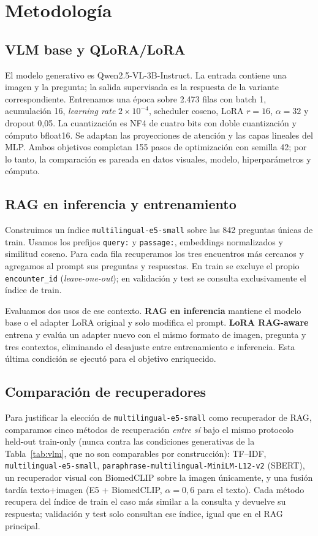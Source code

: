 \documentclass[11pt]{article}
\begin{document}
\section{Metodología}

\subsection{VLM base y QLoRA/LoRA}

El modelo generativo es Qwen2.5-VL-3B-Instruct. La entrada contiene una imagen y la pregunta; la salida supervisada es la respuesta de la variante correspondiente. Entrenamos una época sobre 2.473 filas con batch 1, acumulación 16, \emph{learning rate} $2\times10^{-4}$, scheduler coseno, LoRA $r=16$, $\alpha=32$ y dropout 0,05. La cuantización es NF4 de cuatro bits con doble cuantización y cómputo bfloat16. Se adaptan las proyecciones de atención y las capas lineales del MLP. Ambos objetivos completan 155 pasos de optimización con semilla 42; por lo tanto, la comparación es pareada en datos visuales, modelo, hiperparámetros y cómputo.

\subsection{RAG en inferencia y entrenamiento}

Construimos un índice \texttt{multilingual-e5-small} sobre las 842 preguntas únicas de train. Usamos los prefijos \texttt{query:} y \texttt{passage:}, embeddings normalizados y similitud coseno. Para cada fila recuperamos los tres encuentros más cercanos y agregamos al prompt sus preguntas y respuestas. En train se excluye el propio \texttt{encounter\_id} (\emph{leave-one-out}); en validación y test se consulta exclusivamente el índice de train.

Evaluamos dos usos de ese contexto. \textbf{RAG en inferencia} mantiene el modelo base o el adapter LoRA original y solo modifica el prompt. \textbf{LoRA RAG-aware} entrena y evalúa un adapter nuevo con el mismo formato de imagen, pregunta y tres contextos, eliminando el desajuste entre entrenamiento e inferencia. Esta última condición se ejecutó para el objetivo enriquecido.

\subsection{Comparación de recuperadores}
\label{sec:retrieval-comparison}

Para justificar la elección de \texttt{multilingual-e5-small} como recuperador de RAG, comparamos cinco métodos de recuperación \emph{entre sí} bajo el mismo protocolo held-out train-only (nunca contra las condiciones generativas de la Tabla~\ref{tab:vlm}, que no son comparables por construcción): TF--IDF, \texttt{multilingual-e5-small}, \texttt{paraphrase-multilingual-MiniLM-L12-v2} (SBERT), un recuperador visual con BiomedCLIP \citep{zhang2023biomedclip} sobre la imagen únicamente, y una fusión tardía texto+imagen (E5 + BiomedCLIP, $\alpha=0,6$ para el texto). Cada método recupera del índice de train el caso más similar a la consulta y devuelve su respuesta; validación y test solo consultan ese índice, igual que en el RAG principal.
\end{document}
